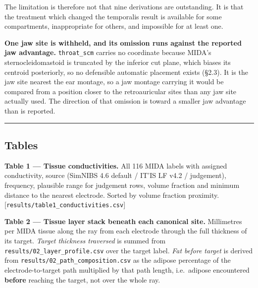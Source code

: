 \documentclass[
  11pt,
  letterpaper,
]{article}
\begin{document}
The limitation is therefore not that nine derivations are outstanding. It is that
the treatment which changed the temporalis result is available for some
compartments, inappropriate for others, and impossible for at least one.

\textbf{One jaw site is withheld, and its omission runs against the reported jaw
advantage.} \texttt{throat\_scm} carries no coordinate because MIDA's
sternocleidomastoid is truncated by the inferior cut plane, which biases its
centroid posteriorly, so no defensible automatic placement exists (§2.3). It is
the jaw site nearest the ear montage, so a jaw montage carrying it would be
compared from a position closer to the retroauricular sites than any jaw site
actually used. The direction of that omission is toward a smaller jaw advantage
than is reported.

\begin{center}\rule{0.5\linewidth}{0.5pt}\end{center}

\subsection{Tables}\label{tables}

\textbf{Table 1 --- Tissue conductivities.} All 116 MIDA labels with assigned
conductivity, source (SimNIBS 4.6 default / IT'IS LF v4.2 / judgement),
frequency, plausible range for judgement rows, volume fraction and minimum
distance to the nearest electrode. Sorted by volume fraction \texttimes{} proximity.
{[}\texttt{results/table1\_conductivities.csv}{]}

\textbf{Table 2 --- Tissue layer stack beneath each canonical site.} Millimetres per
MIDA tissue along the ray from each electrode through the full thickness of its
target. \emph{Target thickness traversed} is summed from \texttt{results/02\_layer\_profile.csv}
over the target label. \emph{Fat before target} is derived from
\texttt{results/02\_path\_composition.csv} as the adipose percentage of the
electrode-to-target path multiplied by that path length, i.e.~adipose
encountered \textbf{before} reaching the target, not over the whole ray.
\end{document}
